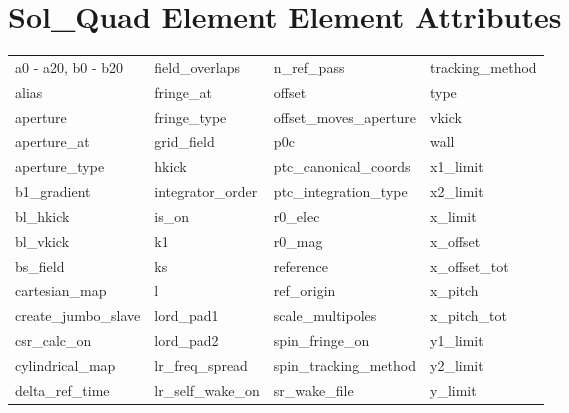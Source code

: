  \vfill
 
 \section{Sol_Quad Element Element Attributes}
 \label{s:list.sol.quad}
 
 \begin{tabular}{llll} \toprule
a0 - a20, b0 - b20          & field_overlaps              & n_ref_pass                  & tracking_method             \\
alias                       & fringe_at                   & offset                      & type                        \\
aperture                    & fringe_type                 & offset_moves_aperture       & vkick                       \\
aperture_at                 & grid_field                  & p0c                         & wall                        \\
aperture_type               & hkick                       & ptc_canonical_coords        & x1_limit                    \\
b1_gradient                 & integrator_order            & ptc_integration_type        & x2_limit                    \\
bl_hkick                    & is_on                       & r0_elec                     & x_limit                     \\
bl_vkick                    & k1                          & r0_mag                      & x_offset                    \\
bs_field                    & ks                          & reference                   & x_offset_tot                \\
cartesian_map               & l                           & ref_origin                  & x_pitch                     \\
create_jumbo_slave          & lord_pad1                   & scale_multipoles            & x_pitch_tot                 \\
csr_calc_on                 & lord_pad2                   & spin_fringe_on              & y1_limit                    \\
cylindrical_map             & lr_freq_spread              & spin_tracking_method        & y2_limit                    \\
delta_ref_time              & lr_self_wake_on             & sr_wake_file                & y_limit                     \\

\end{tabular}
